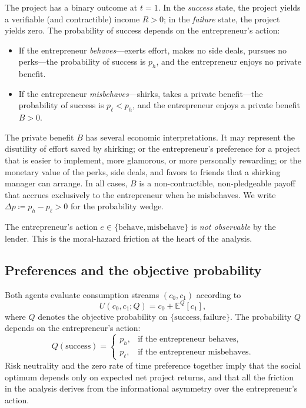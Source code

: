 \documentclass[11pt,a4paper,oneside]{book}
\def\E{\mathbb{E}}
\theoremstyle{plain}
\theoremstyle{definition}
\theoremstyle{remark}
\numberwithin{equation}{chapter}
\begin{document}
The project has a binary outcome at $t=1$.
In the \emph{success} state, the project yields a verifiable (and contractible) income $R > 0$; in the \emph{failure} state, the project yields zero.
The probability of success depends on the entrepreneur's action:
\begin{itemize}
  \item If the entrepreneur \emph{behaves}---exerts effort, makes no side deals, pursues no perks---the probability of success is $p_h$, and the entrepreneur enjoys no private benefit.
  \item If the entrepreneur \emph{misbehaves}---shirks, takes a private benefit---the probability of success is $p_\ell < p_h$, and the entrepreneur enjoys a private benefit $B > 0$.
\end{itemize}
The private benefit $B$ has several economic interpretations.
It may represent the disutility of effort saved by shirking; or the entrepreneur's preference for a project that is easier to implement, more glamorous, or more personally rewarding; or the monetary value of the perks, side deals, and favors to friends that a shirking manager can arrange.
In all cases, $B$ is a non-contractible, non-pledgeable payoff that accrues exclusively to the entrepreneur when he misbehaves.
We write $\Delta p \coloneqq p_h - p_\ell > 0$ for the probability wedge.

The entrepreneur's action $e \in \{ \text{behave}, \text{misbehave} \}$ is \emph{not observable} by the lender.
This is the moral-hazard friction at the heart of the analysis.

\subsection{Preferences and the objective probability}

Both agents evaluate consumption streams $(c_0, c_1)$ according to
\begin{equation*}
  U(c_0, c_1; Q) = c_0 + \E^Q[c_1],
\end{equation*}
where $Q$ denotes the objective probability on $\{ \text{success}, \text{failure} \}$.
The probability $Q$ depends on the entrepreneur's action:
\begin{equation}\label{eq:HT-probability}
  Q(\text{success}) = \begin{cases} p_h, & \text{if the entrepreneur behaves}, \\ p_\ell, & \text{if the entrepreneur misbehaves}. \end{cases}
\end{equation}
Risk neutrality and the zero rate of time preference together imply that the social optimum depends only on expected net project returns, and that all the friction in the analysis derives from the informational asymmetry over the entrepreneur's action.
\end{document}
